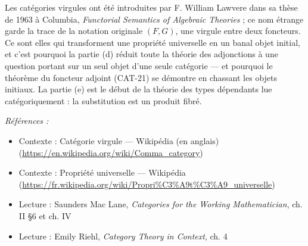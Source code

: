 \documentclass[11pt]{article}
\newenvironment{refs}{\par\small\noindent\emph{Références :}\begin{itemize}\setlength\itemsep{0pt}}{\end{itemize}\normalsize}
\begin{document}
\noindent Les catégories virgules ont été introduites par F. William Lawvere dans sa thèse
de 1963 à Columbia, \textit{Functorial Semantics of Algebraic Theories} ; ce nom étrange garde la
trace de la notation originale $ (F, G) $, une virgule entre deux foncteurs. Ce sont elles qui
transforment une propriété universelle en un banal objet initial, et c'est pourquoi la partie (d)
réduit toute la théorie des adjonctions à une question portant sur un seul objet d'une seule
catégorie --- et pourquoi le théorème du foncteur adjoint (CAT-21) se démontre en chassant les
objets initiaux. La partie (e) est le début de la théorie des types dépendants lue
catégoriquement : la substitution est un produit fibré.

\begin{refs}
\item Contexte : Catégorie virgule --- Wikipédia (en anglais) (\url{https://en.wikipedia.org/wiki/Comma_category})
\item Contexte : Propriété universelle --- Wikipédia (\url{https://fr.wikipedia.org/wiki/Propri%C3%A9t%C3%A9_universelle})
\item Lecture : Saunders Mac Lane, \textit{Categories for the Working Mathematician}, ch. II \S{}6 et ch. IV
\item Lecture : Emily Riehl, \textit{Category Theory in Context}, ch. 4
\end{refs}

\bigskip
\end{document}
